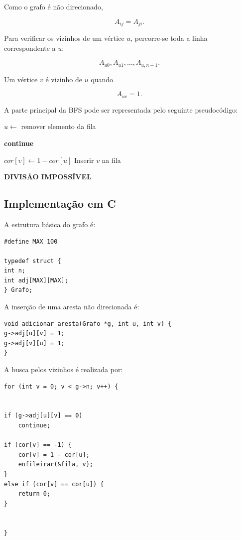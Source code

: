 \documentclass[12pt,a4paper]{article}
\begin{document}
Como o grafo é não direcionado,

$$
A_{ij}=A_{ji}.
$$

Para verificar os vizinhos de um vértice $u$, percorre-se toda a linha
correspondente a $u$:

$$
A_{u0},A_{u1},\ldots,A_{u,n-1}.
$$

Um vértice $v$ é vizinho de $u$ quando

$$
A_{uv}=1.
$$

A parte principal da BFS pode ser representada pelo seguinte
pseudocódigo:

\begin{algorithm}
\caption{BFS utilizando matriz de adjacência}
\begin{algorithmic}[1]

\State $u\gets$ remover elemento da fila



    \State \textbf{continue}
\EndIf

    \State $cor[v]\gets1-cor[u]$
    \State Inserir $v$ na fila

    \State \Return \textbf{DIVISÃO IMPOSSÍVEL}
\EndIf


\EndFor

\end{algorithmic}
\end{algorithm}

\subsection{Implementação em C}

A estrutura básica do grafo é:

\begin{verbatim}
#define MAX 100

typedef struct {
int n;
int adj[MAX][MAX];
} Grafo;
\end{verbatim}

A inserção de uma aresta não direcionada é:

\begin{verbatim}
void adicionar_aresta(Grafo *g, int u, int v) {
g->adj[u][v] = 1;
g->adj[v][u] = 1;
}
\end{verbatim}

A busca pelos vizinhos é realizada por:

\begin{verbatim}
for (int v = 0; v < g->n; v++) {


if (g->adj[u][v] == 0)
    continue;

if (cor[v] == -1) {
    cor[v] = 1 - cor[u];
    enfileirar(&fila, v);
}
else if (cor[v] == cor[u]) {
    return 0;
}


}
\end{verbatim}
\end{document}
